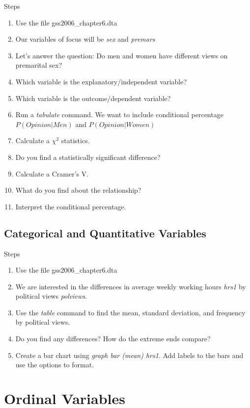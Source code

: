 \documentclass[
]{book}
\providecommand{\tightlist}{%
  \setlength{\itemsep}{0pt}\setlength{\parskip}{0pt}}
\begin{document}
Steps

\begin{enumerate}
\def\labelenumi{\arabic{enumi}.}
\tightlist
\item
  Use the file gss2006\_chapter6.dta
\item
  Our variables of focus will be \emph{sex} and \emph{premars}
\item
  Let's answer the question: Do men and women have different views on premarital sex?
\item
  Which variable is the explanatory/independent variable?
\item
  Which variable is the outcome/dependent variable?
\item
  Run a \emph{tabulate} command. We want to include conditional percentage \(P(Opinion|Men)\) and \(P(Opinion | Women)\)
\item
  Calculate a \(\chi^2\) statistics.
\item
  Do you find a statistically significant difference?
\item
  Calculate a Cramer's V.
\item
  What do you find about the relationship?
\item
  Interpret the conditional percentage.
\end{enumerate}

\subsection{Categorical and Quantitative Variables}\label{categorical-and-quantitative-variables}

Steps

\begin{enumerate}
\def\labelenumi{\arabic{enumi}.}
\tightlist
\item
  Use the file gss2006\_chapter6.dta
\item
  We are interested in the differences in average weekly working hours \emph{hrs1} by political views \emph{polviews}.
\item
  Use the \emph{table} command to find the mean, standard deviation, and frequency by political views.
\item
  Do you find any differences? How do the extreme ends compare?
\item
  Create a bar chart using \emph{graph bar (mean) hrs1}. Add labels to the bars and use the options to format.
\end{enumerate}

\section{Ordinal Variables}\label{ordinal-variables}
\end{document}

